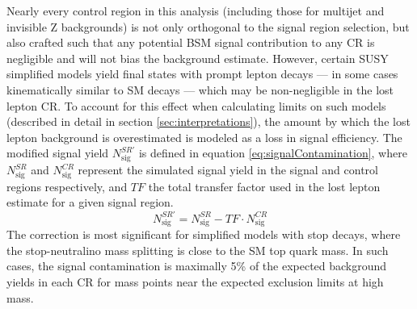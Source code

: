 Nearly every control region in this analysis (including those for multijet and invisible Z backgrounds) is not only orthogonal to the signal region selection, but also crafted such that any potential BSM signal contribution to any CR is negligible and will not bias the background estimate. However, certain SUSY simplified models yield final states with prompt lepton decays --- in some cases kinematically similar to SM \ttbar decays --- which may be non-negligible in the lost lepton CR. To account for this effect when calculating limits on such models (described in detail in section \ref{sec:interpretations}), the amount by which the lost lepton background is overestimated is modeled as a loss in signal efficiency. The modified signal yield $N_{\mathrm{sig}}^{SR\prime}$ is defined in equation \ref{eq:signalContamination}, where $N_{\mathrm{sig}}^{SR}$ and $N_{\mathrm{sig}}^{CR}$ represent the simulated signal yield in the signal and control regions respectively, and $TF$ the total transfer factor used in the lost lepton estimate for a given signal region. 
\begin{equation}
	N_{\mathrm{sig}}^{SR\prime} = N_{\mathrm{sig}}^{SR} - TF \cdot N_{\mathrm{sig}}^{CR}
	\label{eq:signalContamination}
\end{equation}
The correction is most significant for simplified models with stop decays, where the stop-neutralino mass splitting is close to the SM top quark mass. In such cases, the signal contamination is maximally 5\% of the expected background yields in each CR for mass points near the expected exclusion limits at high mass.


